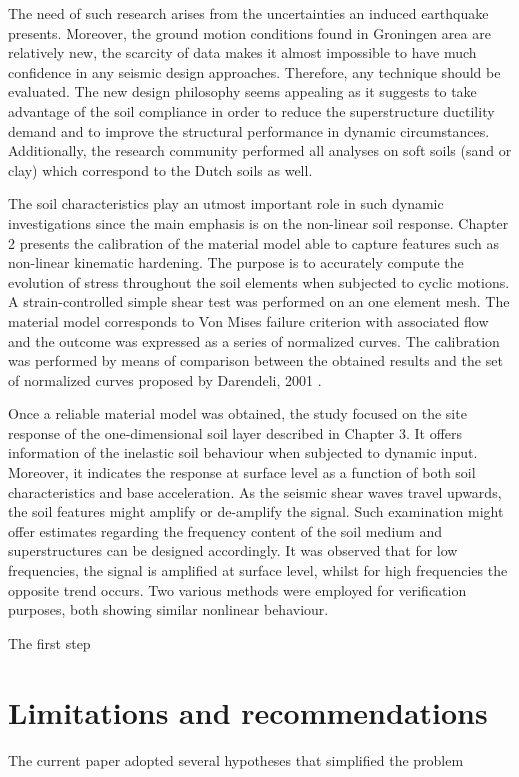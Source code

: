 The need of such research arises from the uncertainties an induced earthquake presents. Moreover, the ground motion conditions found in Groningen area are relatively new, the scarcity of data makes it almost impossible to have much confidence in any seismic design approaches. Therefore, any technique should be evaluated. The new design philosophy seems appealing as it suggests to take advantage of the soil compliance in order to reduce the superstructure ductility demand and to improve the structural performance in dynamic circumstances. Additionally, the research community performed all analyses on soft soils (sand or clay) which correspond to the Dutch soils as well.

The soil characteristics play an utmost important role in such dynamic investigations since the main emphasis is on the non-linear soil response. Chapter 2 presents the calibration of the material model able to capture features such as non-linear kinematic hardening. The purpose is to accurately compute the evolution of stress throughout the soil elements when subjected to cyclic motions. A strain-controlled simple shear test was performed on an one element mesh. The material model corresponds to Von Mises failure criterion with associated flow and the outcome was expressed as a series of normalized curves. The calibration was performed by means of comparison between the obtained results and the set of normalized curves proposed by Darendeli, 2001 \cite{darendeli2001development}.

Once a reliable material model was obtained, the study focused on the site response of the one-dimensional soil layer described in Chapter 3. It offers information of the inelastic soil behaviour when subjected to dynamic input. Moreover, it indicates the response at surface level as a function of both soil characteristics and base acceleration. As the seismic shear waves travel upwards, the soil features might amplify or de-amplify the signal. Such examination might offer estimates regarding the frequency content of the soil medium and superstructures can be designed accordingly. It was observed that for low frequencies, the signal is amplified at surface level, whilst for high frequencies the opposite trend occurs. Two various methods were employed for verification purposes, both showing similar nonlinear behaviour.

  



The first step 
\section{Limitations and recommendations}
The current paper adopted several hypotheses that simplified the problem
\newpage

